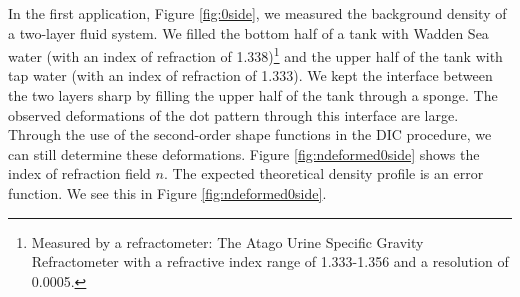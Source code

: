 \documentclass[draft]{svjour3}                     %
\begin{document}
In the first application, Figure \ref{fig:0side}, we measured the background density of a two-layer fluid system. We filled the bottom half of a tank with Wadden Sea water (with an index of refraction of 1.338)\footnote{Measured by a refractometer: The Atago Urine Specific Gravity Refractometer with a refractive index range of 1.333-1.356 and a resolution of 0.0005.} and the upper half of the tank with tap water (with an index of refraction of 1.333). We kept the interface between the two layers sharp by filling the upper half of the tank through a sponge. The observed deformations of the dot pattern through this interface are large. Through the use of the second-order shape functions in the DIC procedure, we can still determine these deformations. Figure \ref{fig:ndeformed0side} shows the index of refraction field $n$. The expected theoretical density profile is an error function. We see this in Figure \ref{fig:ndeformed0side}.
\end{document}
